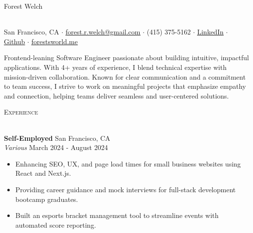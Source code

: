 \documentclass[a4paper]{article}
\newcommand{\header}[1]{
    {\hspace*{-18pt}\vspace*{3pt} \textcolor{deeppurple}{\textsc{#1}}}
    \vspace*{-12pt} \\
    \hspace*{-18pt} \textcolor{deeppurple}{\hrulefill} \\
}
\begin{document}
\vspace{-40pt}

\begin{center}
    \begin{minipage}{\textwidth}
        \centering
        {\fontsize{36}{36}\selectfont \textcolor{deeppurple}{Forest Welch}}
        \hspace{0.3cm}
    \end{minipage}
    \\ 
    \vspace{10pt}
    \small San Francisco, CA $\cdot$ \href{mailto:forest.r.welch@gmail.com}{\underline{forest.r.welch@gmail.com}} $\cdot$ (415) 375-5162 $\cdot$ \href{https://linkedin.com/in/forestrwelch}{\underline{LinkedIn}} $\cdot$ \href{https://github.com/nwelchr}{\underline{Github}} $\cdot$ \href{https://forestsworld.me/}{\underline{forestsworld.me}}
\end{center}

\begin{center}
    Frontend-leaning Software Engineer passionate about building intuitive, impactful applications. With 4+ years of experience, I blend technical expertise with mission-driven collaboration. Known for clear communication and a commitment to team success, I strive to work on meaningful projects that emphasize empathy and connection, helping teams deliver seamless and user-centered solutions.
\end{center}

\header{Experience}
\vspace{1mm}

\textbf{Self-Employed} \hfill San Francisco, CA\\
\textit{Various} \hfill March 2024 - August 2024\\
\vspace{-1mm}
\begin{itemize} \itemsep .5pt
    \item Enhancing SEO, UX, and page load times for small business websites using React and Next.js.
    \item Providing career guidance and mock interviews for full-stack development bootcamp graduates.
    \item Built an esports bracket management tool to streamline events with automated score reporting.
\end{itemize}
\end{document}
